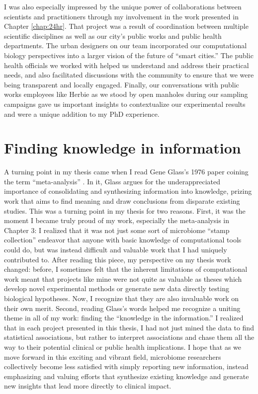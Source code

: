 I was also especially impressed by the unique power of collaborations between scientists and practitioners through my involvement in the work presented in Chapter \ref{chap:24hr}.
That project was a result of coordination between multiple scientific disciplines as well as our city's public works and public health departments.
The urban designers on our team incorporated our computational biology perspectives into a larger vision of the future of ``smart cities.''
The public health officials we worked with helped us understand and address their practical needs, and also facilitated discussions with the community to ensure that we were being transparent and locally engaged.
Finally, our conversations with public works employees like Herbie as we stood by open manholes during our sampling campaigns gave us important insights to contextualize our experimental results and were a unique addition to my PhD experience.

\section{Finding knowledge in information}

A turning point in my thesis came when I read Gene Glass's 1976 paper coining the term ``meta-analysis'' \cite{glass-1976}.
In it, Glass argues for the underappreciated importance of consolidating and synthesizing information into knowledge, prizing work that aims to find meaning and draw conclusions from disparate existing studies.
This was a turning point in my thesis for two reasons.
First, it was the moment I became truly proud of my work, especially the meta-analysis in Chapter 3: I realized that it was not just some sort of microbiome ``stamp collection'' endeavor that anyone with basic knowledge of computational tools could do, but was instead difficult and valuable work that I had uniquely contributed to.
After reading this piece, my perspective on my thesis work changed: before, I sometimes felt that the inherent limitations of computational work meant that projects like mine were not quite as valuable as theses which develop novel experimental methods or generate new data directly testing biological hypotheses.
Now, I recognize that they are also invaluable work on their own merit.
Second, reading Glass's words helped me recognize a uniting theme in all of my work: finding the ``knowledge in the information.''
I realized that in each project presented in this thesis, I had not just mined the data to find statistical associations, but rather to interpret associations and chase them all the way to their potential clinical or public health implications.
I hope that as we move forward in this exciting and vibrant field, microbiome researchers collectively become less satisfied with simply reporting new information, instead emphasizing and valuing efforts that synthesize existing knowledge and generate new insights that lead more directly to clinical impact.

\begin{singlespace}


\end{singlespace}
